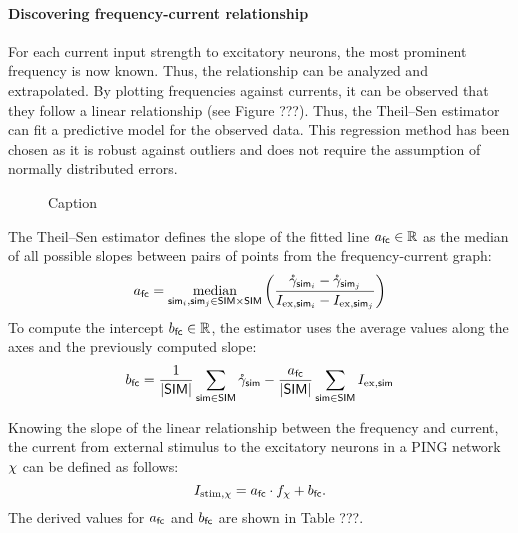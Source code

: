 \paragraph{Discovering frequency-current relationship}

For each current input strength to excitatory neurons, the most prominent frequency is now known. Thus, the relationship can be analyzed and extrapolated. By plotting frequencies against currents, it can be observed that they follow a linear relationship (see Figure ???). Thus, the Theil–Sen estimator can fit a predictive model for the observed data. This regression method has been chosen as it is robust against outliers and does not require the assumption of normally distributed errors. 

\begin{figure}[!htp]
    \centering
    
    \caption{Caption}
    \label{fig:my_label}
\end{figure}

The Theil–Sen estimator defines the slope of the fitted line $a_\mathsf{fc} \in \mathbb{R}$ as the median of all possible slopes between pairs of points from the frequency-current graph:
\begin{equation}
    a_\mathsf{fc} = \operatorname*{median}_{
        \mathsf{sim}_i, \mathsf{sim}_j \in \mathsf{SIM} \times \mathsf{SIM}
    } \left( 
        \frac{
            \mathring{\gamma}_{\mathsf{sim}_i} - \mathring{\gamma}_{\mathsf{sim}_j}
        }{
            I_{\mathrm{ex}, \mathsf{sim}_i} - I_{\mathrm{ex}, \mathsf{sim}_j}
        } 
    \right)
\end{equation}
To compute the intercept $b_\mathsf{fc} \in \mathbb{R}$, the estimator uses the average values along the axes and the previously computed slope:
\begin{equation}
    b_\mathsf{fc} = 
    \frac{1}{|\mathsf{SIM}|}
    \sum_{\mathsf{sim} \in \mathsf{SIM}}
    \mathring{\gamma}_{\mathsf{sim}}
    -
    \frac{a_\mathsf{fc}}{|\mathsf{SIM}|}
    \sum_{\mathsf{sim} \in \mathsf{SIM}}
    I_{\mathrm{ex}, \mathsf{sim}}
\end{equation}

Knowing the slope of the linear relationship between the frequency and current, the current from external stimulus to the excitatory neurons in a PING network $\chi$ can be defined as follows:
\begin{equation}
    I_{\mathrm{stim}, \chi} = a_\mathsf{fc} \cdot f_\chi + b_\mathsf{fc}.
\end{equation}
The derived values for $a_\mathsf{fc}$ and $b_\mathsf{fc}$ are shown in Table ???.

